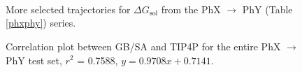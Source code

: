 \documentclass[12pt]{report}
\begin{document}
\begin{figure}[p] 
\centering
\hspace*{-1.3cm}\\
\hspace*{-1.3cm}\\
\hspace*{-1.3cm}\\
\caption{More selected trajectories for $\Delta G_\textrm{sol}$ from the PhX $\longrightarrow$ PhY (Table \ref{phxphy}) series.}
\label{dgsolphxy2}
\end{figure}

\begin{figure}[t!]
\centering

\caption{Correlation plot between GB/SA and TIP4P for the entire PhX $\longrightarrow$ PhY test set, $r^2$ = 0.7588, $y = 0.9708x + 0.7141$.}
\label{corrphxy}
\end{figure}
\end{document}
